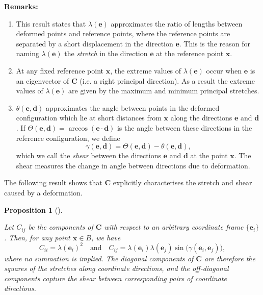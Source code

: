 \documentclass[
  letterpaper,
  DIV=11,
  numbers=noendperiod]{scrreprt}
\theoremstyle{plain}
\newtheorem{proposition}{Proposition}[chapter]
\theoremstyle{remark}
\begin{document}
\textbf{Remarks:}

\begin{enumerate}
\def\labelenumi{\arabic{enumi}.}
\item
  This result states that \(\lambda({\boldsymbol{e}})\) approximates the
  ratio of lengths between deformed points and reference points, where
  the reference points are separated by a short displacement in the
  direction \({\boldsymbol{e}}\). This is the reason for naming
  \(\lambda({\boldsymbol{e}})\) the \emph{stretch} in the direction
  \({\boldsymbol{e}}\) at the reference point \({\boldsymbol{x}}\).
\item
  At any fixed reference point \({\boldsymbol{x}}\), the extreme values
  of \(\lambda({\boldsymbol{e}})\) occur when \({\boldsymbol{e}}\) is an
  eigenvector of \({\boldsymbol{C}}\) (i.e. a right principal
  direction). As a result the extreme values of
  \(\lambda({\boldsymbol{e}})\) are given by the maximum and minimum
  principal stretches.
\item
  \(\theta({\boldsymbol{e}},{\boldsymbol{d}})\) approximates the angle
  between points in the deformed configuration which lie at short
  distances from \({\boldsymbol{x}}\) along the directions
  \({\boldsymbol{e}}\) and \({\boldsymbol{d}}\). If
  \(\Theta({\boldsymbol{e}},{\boldsymbol{d}}) = \arccos({\boldsymbol{e}}\cdot{\boldsymbol{d}})\)
  is the angle between these directions in the reference configuration,
  we define
  \[\gamma({\boldsymbol{e}},{\boldsymbol{d}}) = \Theta({\boldsymbol{e}},{\boldsymbol{d}})-\theta({\boldsymbol{e}},{\boldsymbol{d}}),\]
  which we call the \emph{shear} between the directions
  \({\boldsymbol{e}}\) and \({\boldsymbol{d}}\) at the point
  \({\boldsymbol{x}}\). The shear measures the change in angle between
  directions due to deformation.
\end{enumerate}

The following result shows that \({\boldsymbol{C}}\) explicitly
characterises the stretch and shear caused by a deformation.

\begin{proposition}[]\protect\hypertarget{prp-stretchshear}{}\label{prp-stretchshear}

Let \(C_{ij}\) be the components of \({\boldsymbol{C}}\) with respect to
an arbitrary coordinate frame \(\{{\boldsymbol{e}}_i\}\). Then, for any
point \({\boldsymbol{x}}\in B\), we have
\[C_{ii} = \lambda({\boldsymbol{e}}_i)^2\quad\text{and}\quad C_{ij} = \lambda({\boldsymbol{e}}_i)\lambda({\boldsymbol{e}}_j)\sin\big(\gamma({\boldsymbol{e}}_i,{\boldsymbol{e}}_j)\big),\]
where no summation is implied. The diagonal components of
\({\boldsymbol{C}}\) are therefore the squares of the stretches along
coordinate directions, and the off-diagonal components capture the shear
between corresponding pairs of coordinate directions.

\end{proposition}
\end{document}
